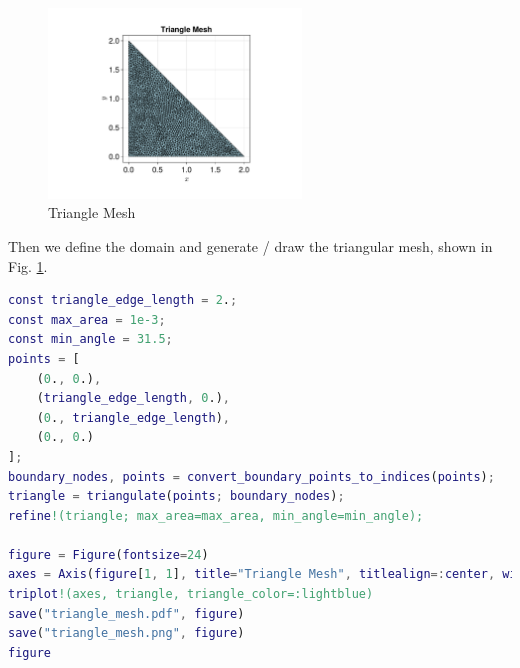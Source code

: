 \begin{figure}[H]
    \centering
    \includegraphics[width=0.6\textwidth]{../problem1/images/triangle_mesh.pdf}
    \caption{Triangle Mesh}
    \label{fig:triangle_mesh}
\end{figure}

Then we define the domain and generate / draw the triangular mesh, 
shown in Fig. \ref{fig:triangle_mesh}.
\begin{lstlisting}[language=matlab]
const triangle_edge_length = 2.;
const max_area = 1e-3;
const min_angle = 31.5;
points = [
    (0., 0.),
    (triangle_edge_length, 0.),
    (0., triangle_edge_length),
    (0., 0.)
];
boundary_nodes, points = convert_boundary_points_to_indices(points);
triangle = triangulate(points; boundary_nodes);
refine!(triangle; max_area=max_area, min_angle=min_angle);

figure = Figure(fontsize=24)
axes = Axis(figure[1, 1], title="Triangle Mesh", titlealign=:center, width=400, height=400, xlabel=L"$x$", ylabel=L"$y$")
triplot!(axes, triangle, triangle_color=:lightblue)
save("triangle_mesh.pdf", figure)
save("triangle_mesh.png", figure)
figure
\end{lstlisting}

